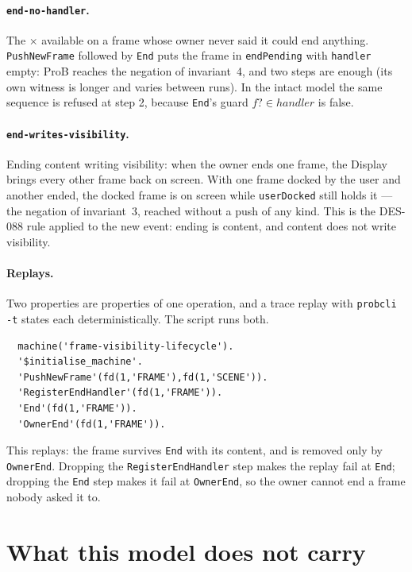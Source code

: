 \documentclass[a4paper,10pt,fleqn]{article}
\begin{document}
\paragraph{\texttt{end-no-handler}.}  The $\times$ available on a frame whose
owner never said it could end anything.  \texttt{PushNewFrame} followed by
\texttt{End} puts the frame in \texttt{endPending} with \texttt{handler}
empty: ProB reaches the negation of invariant~4, and two steps are enough
(its own witness is longer and varies between runs).  In the intact
model the same sequence is refused at step 2, because \texttt{End}'s guard
$f? \in handler$ is false.

\paragraph{\texttt{end-writes-visibility}.}  Ending content writing
visibility: when the owner ends one frame, the Display brings every other
frame back on screen.  With one frame docked by the user and another ended,
the docked frame is on screen while \texttt{userDocked} still holds it ---
the negation of invariant~3, reached without a push of any kind.  This is the
DES-088 rule applied to the new event: ending is content, and content does
not write visibility.

\paragraph{Replays.}  Two properties are properties of one operation, and a
trace replay with \texttt{probcli -t} states each deterministically.  The
script runs both.

\begin{verbatim}
  machine('frame-visibility-lifecycle').
  '$initialise_machine'.
  'PushNewFrame'(fd(1,'FRAME'),fd(1,'SCENE')).
  'RegisterEndHandler'(fd(1,'FRAME')).
  'End'(fd(1,'FRAME')).
  'OwnerEnd'(fd(1,'FRAME')).
\end{verbatim}

\noindent
This replays: the frame survives \texttt{End} with its content, and is removed
only by \texttt{OwnerEnd}.  Dropping the \texttt{RegisterEndHandler} step makes
the replay fail at \texttt{End}; dropping the \texttt{End} step makes it fail at
\texttt{OwnerEnd}, so the owner cannot end a frame nobody asked it to.

\section{What this model does not carry}
\end{document}
